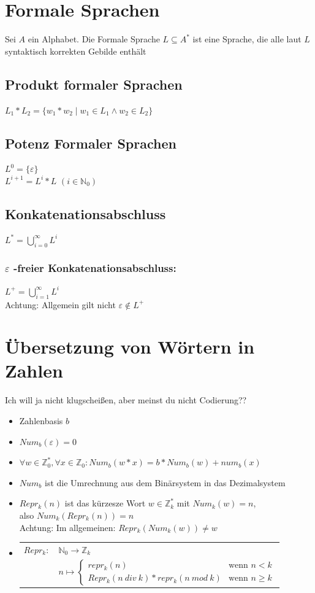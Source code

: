 \documentclass[a4paper,portrait]{scrartcl}
\begin{document}
\section{Formale Sprachen}
Sei $A$ ein Alphabet. Die Formale Sprache $ L \subseteq A^{*}$ ist eine Sprache, die alle laut $L$ syntaktisch korrekten Gebilde enthält
\subsection{Produkt formaler Sprachen}
$ L_{1} * L_{2} = \lbrace w_{1}*w_{2} \mid w_{1} \in L_{1} \wedge w_{2} \in L_{2} \rbrace $
\subsection{Potenz Formaler Sprachen}
$ L^{0} = \lbrace \varepsilon \rbrace $ \\
$ L^{i+1} = L^{i}*L$ $(i \in \mathbb{N}_{0})$
\subsection{Konkatenationsabschluss}
$L^{*} = \bigcup\limits_{i = 0}^{\infty} L^{i}$
\subsubsection{$\varepsilon$ -freier Konkatenationsabschluss:}
$L^{+} = \bigcup\limits_{i = 1}^{\infty} L^{i}$ \\
Achtung: Allgemein gilt nicht $ \varepsilon \notin L^{+} $
\section{Übersetzung von Wörtern in Zahlen}
Ich will ja nicht klugscheißen, aber meinst du nicht Codierung?? \\
\begin{itemize}
\item Zahlenbasis $b$
\item $ Num_{b}(\varepsilon) = 0 $ 
\item $ \forall w \in \mathbb{Z}_{0}^{*}, \forall x \in  \mathbb{Z}_{0}: Num_{b}(w * x) = b*Num_{b}(w) + num_{b}(x)$ 
\item $ Num_{b} $ ist die Umrechnung aus dem Binärsystem in das Dezimalsystem 
\item $ Repr_{k}(n) $ ist das kürzesze Wort $ w \in \mathbb{Z}_{k}^{*} $ mit $ Num_{k}(w) = n $, \\also $ Num_{k}(Repr_{k}(n)) = n $\\
Achtung: Im allgemeinen: $Repr_{k}(Num_{k}(w)) \neq w$ 

\item \begin{tabular}{p{1cm}l}
$ Repr_{k}: $&$ \mathbb{N}_{0} \rightarrow \mathbb{Z}_{k}$\\

& $ n\mapsto\begin{cases}
repr_{k}(n)&\text{wenn } n<k \\
Repr_{k}(n\:div\:k)*repr_{k}(n\:mod\:k)&\text{wenn } n \geq k
\end{cases}$
\end{tabular}
\end{itemize}
\end{document}
